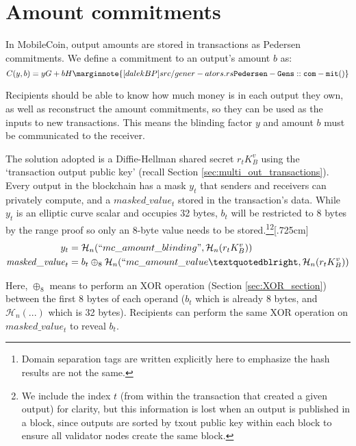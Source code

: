 \section{Amount commitments}
\label{sec:pedersen-ringct}

In MobileCoin, output amounts are stored in transactions as Pedersen commitments. We define a commitment to an output’s amount $b$ as:\vspace{.175cm}
\[C(y,b) = y G + b H\marginnote{[dalekBP] src/gener- ators.rs {\tt Pedersen- Gens::com- mit()}}\]

Recipients should be able to know how much money is in each output they own, as well as reconstruct the amount commitments, so they can be used as the inputs to new transactions. This means the blinding factor $y$ and amount $b$ must be communicated to the receiver.

The solution adopted is a Diffie-Hellman shared secret $r_t K_B^v$ using the `transaction output public key' (recall Section \ref{sec:multi_out_transactions}). Every output in the blockchain has a mask $y_t$ that senders and receivers can privately compute, and a $\mathit{masked\_value}_t$ stored in the transaction's data. While $y_t$ is an elliptic curve scalar and occupies 32 bytes, $b_t$ will be restricted to 8 bytes by the range proof so only an 8-byte value needs to be stored.\footnote{Domain separation tags are written explicitly here to emphasize the hash results are not the same.}\footnote{We include the index $t$ (from within the transaction that created a given output) for clarity, but this information is lost when an output is published in a block, since outputs are sorted by txout public key within each block to ensure all validator nodes create the same block.}[.725cm]\vspace{.175cm}
\begin{align*}
  y_t &= \mathcal{H}_n(``mc\_amount\_blinding",\mathcal{H}_n(r_t K_B^v)) \\
  \mathit{masked\_value}_t &= b_t \oplus_8 \mathcal{H}_n(``mc\_amount\_value”, \mathcal{H}_n(r_t K_B^v))
\end{align*}

Here, $\oplus_8$ means to perform an XOR operation (Section \ref{sec:XOR_section}) between the first 8 bytes of each operand ($b_t$ which is already 8 bytes, and $\mathcal{H}_n(...)$ which is 32 bytes). Recipients can perform the same XOR operation on $\mathit{masked\_value}_t$ to reveal $b_t$.


